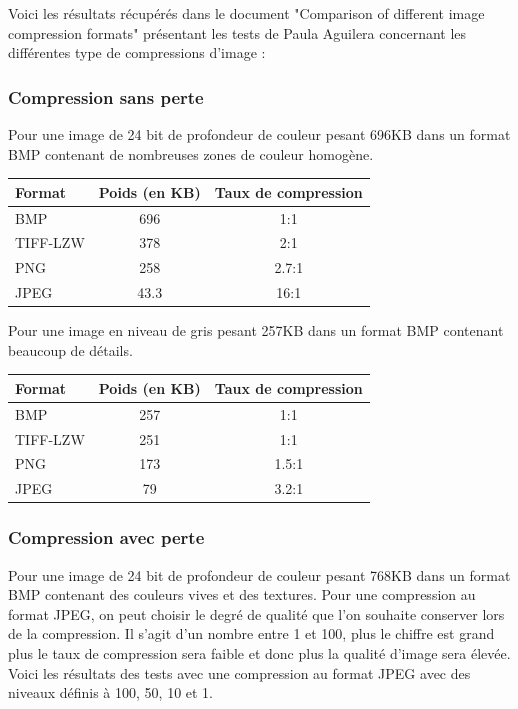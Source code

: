 \documentclass[a4paper, 11pt]{article} %
\begin{document}
Voici les résultats récupérés dans le document "Comparison of different image compression formats"\cite{compression:images-compression-formats} présentant les tests de Paula Aguilera concernant les différentes type de compressions d'image :

\subsubsection*{Compression sans perte}
Pour une image de 24 bit de profondeur de couleur pesant 696KB dans un format BMP contenant de nombreuses zones de couleur homogène.

\begin{center}
\centering
	\begin{tabular}{|l|c|c|}
		\hline
		Format & Poids (en KB)& Taux de compression\\
		\hline
		BMP&696&1:1\\
		TIFF-LZW&378&2:1\\
		PNG&258&2.7:1\\
		JPEG&43.3&16:1\\
		\hline
	\end{tabular}
\end {center}

Pour une image en niveau de gris pesant 257KB dans un format BMP contenant beaucoup de détails.
\begin{center}
\centering
	\begin{tabular}{|l|c|c|}
		\hline
		Format & Poids (en KB)& Taux de compression\\
		\hline
		BMP&257&1:1\\
		TIFF-LZW&251&1:1\\
		PNG&173&1.5:1\\
		JPEG&79&3.2:1\\
		\hline
	\end{tabular}
\end{center}

\subsubsection*{Compression avec perte}

Pour une image de 24 bit de profondeur de couleur pesant 768KB dans un format BMP contenant des couleurs vives et des textures. Pour une compression au format JPEG, on peut choisir le degré de qualité que l'on souhaite conserver lors de la compression. Il s'agit d'un nombre entre 1 et 100, plus le chiffre est grand plus le taux de compression sera faible et donc plus la qualité d'image sera élevée. Voici les résultats des tests avec une compression au format JPEG avec des niveaux définis à 100, 50, 10 et 1.
\end{document}
